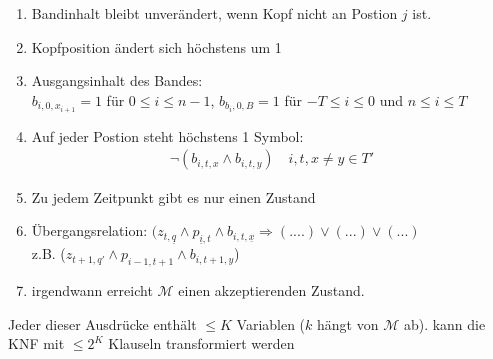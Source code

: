 \begin{enumerate}
\item Bandinhalt bleibt unverändert, wenn Kopf nicht an Postion $j$ ist.
\item Kopfposition ändert sich höchstens um 1
\item Ausgangsinhalt des Bandes:\\ $b_{i,0,x_{i+1}}=1$ für $0\leq i \leq n-1$, $b_{b_i,0,B} = 1$ für $-T \leq i \leq 0$ und $n \leq i \leq T$
\item Auf jeder Postion steht höchstens 1 Symbol:\\
\begin{align*}
\lnot (b_{i,t,x} \land b_{i,t,y}) \quad i,t,x\neq y \in T'
\end{align*}
\item Zu jedem Zeitpunkt gibt es nur einen Zustand
\item Übergangsrelation: $(z_{t,\underline{q}} \land p_{\underline{i}, t} \land b_{i,t, \underline{x}} \Rightarrow (....) \lor (...) \lor (...)$\\
z.B. ($z_{t+1,q'} \land p_{i-1, t+1} \land b_{i, t+1,y}$)
\item irgendwann erreicht $\mathcal{M}$ einen akzeptierenden Zustand.
\end{enumerate}
Jeder dieser Ausdrücke enthält $\leq K$ Variablen ($k$ hängt von $\mathcal{M}$ ab). kann die KNF mit $\leq 2^K$ Klauseln transformiert werden\\